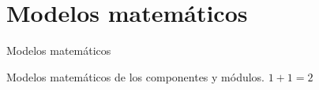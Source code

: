 \section{Modelos matem\'aticos}
\label{Modelos_matematicos}

Modelos matem\'aticos
\par
Modelos matemáticos de los componentes y módulos.
$1+1=2$
